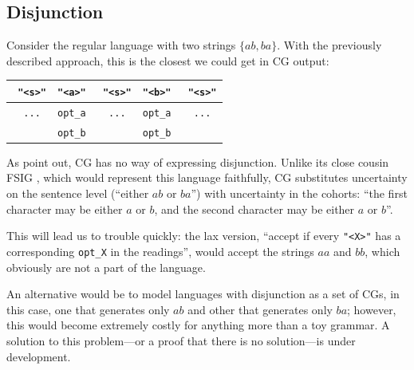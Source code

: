 \documentclass[11pt]{article}
\def\t#1{\texttt{#1}}
\def\h#1{{\tt \color{gray} #1}}
\def\swf{\h{"<s>"}}
\begin{document}
\subsection{Disjunction}

Consider the regular language with two strings $\{ab,ba\}$. 
With the previously described approach, this is the closest we could get in CG output:



\begin{table}[h]
\centering
\begin{tabular}{c|c|c|c|c}
   \swf   &   \t{"<a>"}  &  \swf      & \t{"<b>"}    &  \swf     \\ \hline
  \h{...}  & \t{opt\_a} &  \h{...}    &  \t{opt\_a}  &  \h{...} \\ 
           & \t{opt\_b} &             &  \t{opt\_b}  &            

\end{tabular}
\end{table}

As  point out, CG has no way of expressing disjunction.
Unlike its close cousin FSIG \cite{koskenniemi90}, which would represent this language
faithfully, CG substitutes uncertainty on the sentence level (``either $ab$ or $ba$'')
with uncertainty in the cohorts:
``the first character may be either $a$ or $b$, and the second character may be either $a$ or $b$''.

This will lead us to trouble quickly: the lax version,
``accept if every \t{"<X>"} has a corresponding \t{opt\_X} in the readings'',
would accept the strings $aa$ and $bb$, which obviously are not a part of the language.

An alternative would be to model languages with disjunction as a set of CGs,
in this case, one that generates only $ab$ and other that generates only $ba$;
however, this would become extremely costly for anything more than a toy grammar.
A solution to this problem---or a proof that there is no solution---is under development.

\end{document}
